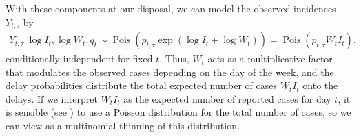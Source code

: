 With these components at our disposal, we can model the observed incidences $Y_{t, \tau}$ by
\begin{align}
    \label{eq:reporting_delays_Y}
    Y_{t, \tau} | \log I_{t}, \log W_{t}, q_{t} \sim \operatorname{Pois} \left( p_{t, \tau}\exp \left(\log I_{t} + \log W_{t}  \right) \right) = \operatorname{Pois} \left( p_{t, \tau} W_{t} I_{t}\right),
\end{align}
conditionally independent for fixed $t$. Thus, $W_{t}$ acts as a multiplicative factor that modulates the observed cases depending on the day of the week, and the delay probabilities distribute the total expected number of cases $W_{t}I_{t}$ onto the delays. If we interpret $W_{t}I_{t}$ as the expected number of reported cases for day $t$, it is sensible (see ) to use a Poisson distribution for the total number of cases, so we can view  as a multinomial thinning of this distribution.  


